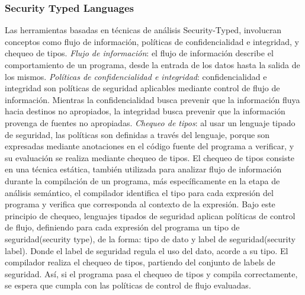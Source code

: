 \subsubsection{Security Typed Languages}
Las herramientas basadas en técnicas de análisis Security-Typed, involucran
conceptos como flujo de información, políticas de confidencialidad e integridad,
y chequeo de tipos.
\emph{Flujo de información}: el flujo de información describe el
comportamiento de un programa, desde la entrada de los datos hasta la salida de
los mismos.\newline 
\emph{Políticas de confidencialidad e integridad}: confidencialidad e integridad
son políticas de seguridad aplicables mediante control de flujo de información.
Mientras la confidencialidad busca prevenir que la información fluya hacia
destinos no apropiados, la integridad busca prevenir que la información provenga
de fuentes no apropiadas\cite{LanguageIFS-2013}.\newline
\emph{Chequeo de tipos}: al usar un lenguaje tipado de seguridad, las políticas
son definidas a través del lenguaje, porque son expresadas mediante anotaciones
en el código fuente del programa a verificar, y su evaluación se realiza
mediante chequeo de tipos.\newline 
El chequeo de tipos consiste en una técnica estática,
también utilizada para analizar flujo de información durante la compilación de
un programa, más específicamente en la etapa de análisis semántico, el
compilador identifica el tipo para cada expresión del programa y verifica que
corresponda al contexto de la expresión.
Bajo este principio de chequeo, lenguajes tipados de seguridad aplican
políticas de control de flujo, definiendo para cada expresión del programa un
tipo de seguridad(security type), de la forma:  tipo de dato y label de
seguridad(security label). Donde el label de seguridad regula el uso del dato,
acorde a su tipo.\newline 
El compilador realiza el chequeo de tipos, partiendo del conjunto de labels de
seguridad. Así, si el programa pasa el chequeo de tipos y compila correctamente,
se espera que cumpla con las políticas de control de flujo evaluadas.

